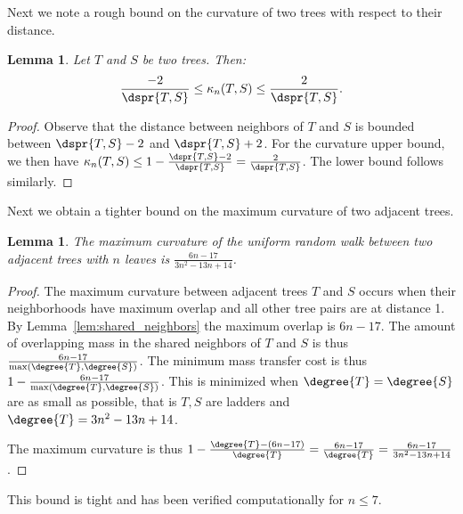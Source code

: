 \documentclass{amsart}
\newtheorem{lemma}[theorem]{Lemma}
\newcommand{\curvature}[2][]{%
    \ifthenelse{\equal{#1}{}}%
		{\kappa_n(#2)}%
		{\kappa_n(#1;#2)}%
}
\begin{document}
Next we note a rough bound on the curvature of two trees with respect to their distance.

\begin{lemma}
	\label{lem:curvature_distance_bound}
	Let $T$ and $S$ be two trees. Then:
	$$ \frac{-2}{\dspr{T,S}} \le \curvature{T,S} \le \frac{2}{\dspr{T,S}} .$$
\end{lemma}
\begin{proof}
	Observe that the distance between neighbors of $T$ and $S$ is bounded between $\dspr{T,S} - 2$ and $\dspr{T,S} + 2$.
	For the curvature upper bound, we then have $\curvature{T,S} \le 1 - \frac{\dspr{T,S} - 2}{\dspr{T,S}} = \frac{2}{\dspr{T,S}}$.
	The lower bound follows similarly.
\end{proof}

Next we obtain a tighter bound on the maximum curvature of two adjacent trees.
\begin{lemma}
	The maximum curvature of the uniform random walk between two adjacent trees with $n$ leaves is $\frac{6n-17}{3n^2-13n+14}$.
\end{lemma}
\begin{proof}
The maximum curvature between adjacent trees $T$ and $S$ occurs when their neighborhoods have maximum overlap and all other tree pairs are at distance 1.
By Lemma~\ref{lem:shared_neighbors} the maximum overlap is $6n-17$.
The amount of overlapping mass in the shared neighbors of $T$ and $S$ is thus $\frac{6n-17}{\max(\degree{T},\degree{S})}$.
The minimum mass transfer cost is thus $1 - \frac{6n-17}{\max(\degree{T},\degree{S})}$.
This is minimized when $\degree{T}=\degree{S}$ are as small as possible, that is $T,S$ are ladders and $\degree{T} = 3n^2 - 13n + 14$.

The maximum curvature is thus $1 - \frac{\degree{T} - (6n-17)}{\degree{T}} = \frac{6n - 17}{\degree{T}}= \frac{6n-17}{3n^2-13n+14}$.
\end{proof}
This bound is tight and has been verified computationally for $n \le 7$.
\end{document}
